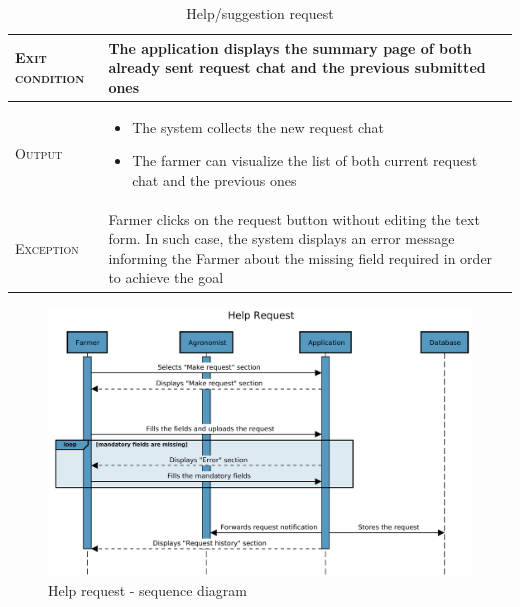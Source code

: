 \begin{table}[H]
\begin{tabular}{|l|p{}|}
        \hline %
        \textsc{Exit condition}    &  The application displays the summary page of both already sent request chat and the previous submitted ones\\
    	\hline %
    	\textsc{Output}             &  \begin{itemize}
    	    \item The system collects the new request chat
    	    \item The farmer can visualize the list of both current request chat and the previous ones
    	\end{itemize}\\
    	\hline %
    	\textsc{Exception}         &  Farmer clicks on the request button without editing the text form. In such case, the system displays an error message informing the Farmer about the missing field required in order to achieve the goal\\
    	\hline %
        
    \end{tabular}
    \caption{\label{tab:Help_request_submission}Help/suggestion request}

\end{table}

\begin{figure}[H]
	\centering
    \includegraphics[page=1, width=\textwidth]{Images/SeqDiag/help_request_seq_diag.pdf}
	\caption{\label{fig:help_request_seq_diag}Help request - sequence diagram}
\end{figure}

